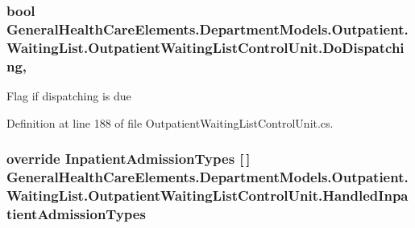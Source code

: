 \subsubsection[{\texorpdfstring{Do\+Dispatching}{DoDispatching}}]{\setlength{\rightskip}{0pt plus 5cm}bool General\+Health\+Care\+Elements.\+Department\+Models.\+Outpatient.\+Waiting\+List.\+Outpatient\+Waiting\+List\+Control\+Unit.\+Do\+Dispatching\hspace{0.3cm}{\ttfamily [get]}, {\ttfamily [set]}}\hypertarget{class_general_health_care_elements_1_1_department_models_1_1_outpatient_1_1_waiting_list_1_1_out0eb5e03b9183fdbdabb1cbe4530cecf4_a3f7df95acb6acc955ec4bbacf74834b0}{}\label{class_general_health_care_elements_1_1_department_models_1_1_outpatient_1_1_waiting_list_1_1_out0eb5e03b9183fdbdabb1cbe4530cecf4_a3f7df95acb6acc955ec4bbacf74834b0}


Flag if dispatching is due 



Definition at line 188 of file Outpatient\+Waiting\+List\+Control\+Unit.\+cs.

\subsubsection[{\texorpdfstring{Handled\+Inpatient\+Admission\+Types}{HandledInpatientAdmissionTypes}}]{\setlength{\rightskip}{0pt plus 5cm}override {\bf Inpatient\+Admission\+Types} \mbox{[}$\,$\mbox{]} General\+Health\+Care\+Elements.\+Department\+Models.\+Outpatient.\+Waiting\+List.\+Outpatient\+Waiting\+List\+Control\+Unit.\+Handled\+Inpatient\+Admission\+Types\hspace{0.3cm}{\ttfamily [get]}}\hypertarget{class_general_health_care_elements_1_1_department_models_1_1_outpatient_1_1_waiting_list_1_1_out0eb5e03b9183fdbdabb1cbe4530cecf4_a945b438af3a2aed9c38c4c192ece59aa}{}\label{class_general_health_care_elements_1_1_department_models_1_1_outpatient_1_1_waiting_list_1_1_out0eb5e03b9183fdbdabb1cbe4530cecf4_a945b438af3a2aed9c38c4c192ece59aa}


